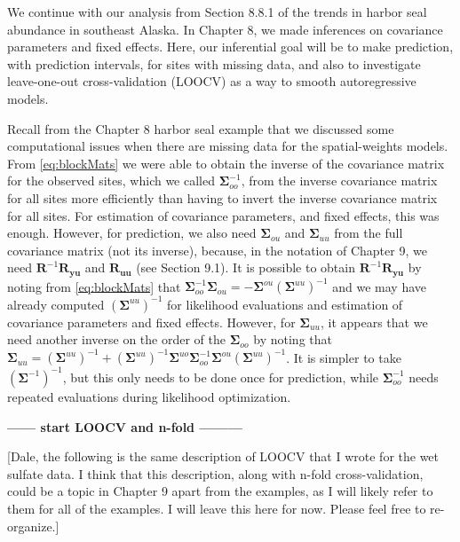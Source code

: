 \documentclass[12pt, titlepage]{article}
\begin{document}
\vspace{.3cm}

We continue with our analysis from Section 8.8.1 of the trends in harbor seal abundance in southeast Alaska.  In Chapter 8, we made inferences on covariance parameters and fixed effects.  Here, our inferential goal will be to make prediction, with prediction intervals, for sites with missing data, and also to investigate leave-one-out cross-validation (LOOCV) as a way to smooth autoregressive models.

Recall from the Chapter 8 harbor seal example that we discussed some computational issues when there are missing data for the spatial-weights models.  From \eqref{eq:blockMats} we were able to obtain the inverse of the covariance matrix for the observed sites, which we called $\boldsymbol{\Sigma}_{oo}^{-1}$, from the inverse covariance matrix for all sites more efficiently than having to invert the inverse covariance matrix for all sites.  For estimation of covariance parameters, and fixed effects, this was enough.  However, for prediction, we also need $\boldsymbol{\Sigma}_{ou}$ and $\boldsymbol{\Sigma}_{uu}$ from the full covariance matrix (not its inverse), because, in the notation of Chapter 9, we need $\mathbf{R}^{-1}\mathbf{R}_{\mathbf{y}\mathbf{u}}$ and $\mathbf{R}_{\mathbf{u}\mathbf{u}}$ (see Section 9.1). It is possible to obtain $\mathbf{R}^{-1}\mathbf{R}_{\mathbf{y}\mathbf{u}}$ by noting from \eqref{eq:blockMats} that $\boldsymbol{\Sigma}_{oo}^{-1}\boldsymbol{\Sigma}_{ou} = -\boldsymbol{\Sigma}^{ou} (\boldsymbol{\Sigma}^{uu})^{-1}$ and we may have already computed $(\boldsymbol{\Sigma}^{uu})^{-1}$ for likelihood evaluations and estimation of covariance parameters and fixed effects.  However, for $\boldsymbol{\Sigma}_{uu}$, it appears that we need another inverse on the order of the $\boldsymbol{\Sigma}_{oo}$ by noting that $\boldsymbol{\Sigma}_{uu} = (\boldsymbol{\Sigma}^{uu})^{-1} + (\boldsymbol{\Sigma}^{uu})^{-1}\boldsymbol{\Sigma}^{uo} \boldsymbol{\Sigma}_{oo}^{-1}\boldsymbol{\Sigma}^{ou} (\boldsymbol{\Sigma}^{uu})^{-1}$.  It is simpler to take $(\boldsymbol{\Sigma}^{-1})^{-1}$, but this only needs to be done once for prediction, while $\boldsymbol{\Sigma}_{oo}^{-1}$ needs repeated evaluations during likelihood optimization.

{\large \center \textbf{ ------ start LOOCV and n-fold ---------}}
\vspace{.3cm}

[Dale, the following is the same description of LOOCV that I wrote for the wet sulfate data.  I think that this description, along with n-fold cross-validation, could be a topic in Chapter 9 apart from the examples, as I will likely refer to them for all of the examples.  I will leave this here for now.  Please feel free to re-organize.]
\end{document}
